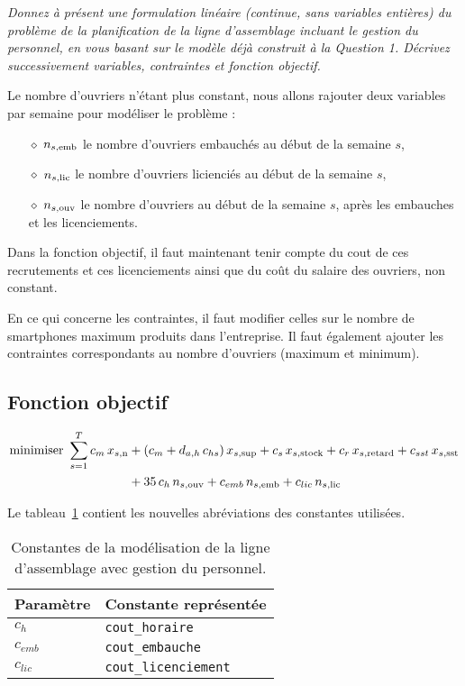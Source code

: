 \question %
\emph{Donnez à présent une formulation linéaire (continue, sans variables
entières) du problème de la planification de la ligne d'assemblage
incluant le gestion du personnel, en vous basant sur le modèle déjà 
construit à la Question 1. Décrivez successivement variables, 
contraintes et fonction objectif.}

Le nombre d'ouvriers n'étant plus constant, nous allons rajouter deux variables
par semaine pour modéliser le problème :
\begin{itemize}
  \item[$\diamond$] $n_{s,\text{emb}}$ le nombre d'ouvriers embauchés au début de la semaine $s$,
  \item[$\diamond$] $n_{s,\text{lic}}$ le nombre d'ouvriers licienciés au début de la semaine $s$,
  \item[$\diamond$] $n_{s,\text{ouv}}$ le nombre d'ouvriers au début de la semaine $s$,
  après les embauches et les licenciements.
\end{itemize}

Dans la fonction objectif, il faut maintenant tenir compte du cout de 
ces recrutements et ces licenciements 
ainsi que du coût du salaire des ouvriers, non constant.

En ce qui concerne les contraintes, il faut modifier celles sur 
le nombre de smartphones maximum produits dans l'entreprise. 
Il faut également ajouter les contraintes correspondants 
au nombre d'ouvriers (maximum et minimum).

\subsection*{Fonction objectif}
\begin{align*}
  \mbox{minimiser } 
  \sum_{s=1}^{T} 
  c_m\, x_{s,\text{n}} &+ (c_m + d_{a,h} \, c_{hs})\, x_{s,\text{sup}}
  + c_s\, x_{s,\text{stock}} + c_r\, x_{s,\text{retard}} + c_{sst}\, x_{s,\text{sst}} \\
  &+ 35 \, c_{h} \, n_{s,\text{ouv}} 
  + c_{emb} \, n_{s,\text{emb}} + c_{lic} \, n_{s,\text{lic}}
\end{align*}

Le tableau~\ref{tab:constantesQuestion7} contient les nouvelles abréviations
des constantes utilisées.
\begin{table}[h]
  \begin{center}
  \begin{tabular}{|l|l|}
    \hline
    Paramètre & Constante représentée \\
    \hline
    \hline
    $c_{h}$ & \texttt{cout\_horaire} \\
    \hline
    $c_{emb}$ & \texttt{cout\_embauche} \\
    \hline
    $c_{lic}$ & \texttt{cout\_licenciement} \\
    \hline
  \end{tabular}
  \caption{Constantes de la modélisation de la ligne d'assemblage
  avec gestion du personnel.}
  \label{tab:constantesQuestion7}
  \end{center}
\end{table}

